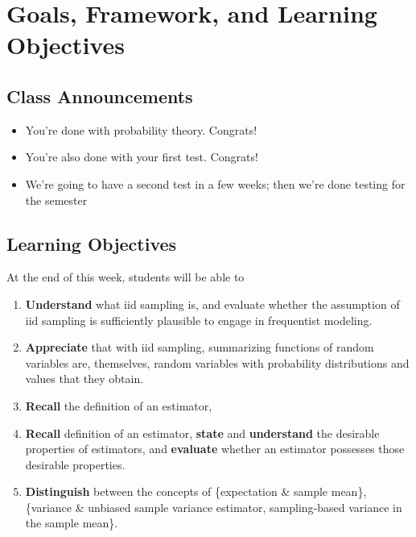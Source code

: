\documentclass[
]{book}
\providecommand{\tightlist}{%
  \setlength{\itemsep}{0pt}\setlength{\parskip}{0pt}}
\theoremstyle{definition}
\theoremstyle{definition}
\theoremstyle{definition}
\theoremstyle{definition}
\theoremstyle{remark}
\begin{document}
\hypertarget{goals-framework-and-learning-objectives}{%
\section{Goals, Framework, and Learning Objectives}\label{goals-framework-and-learning-objectives}}

\hypertarget{class-announcements-3}{%
\subsection{Class Announcements}\label{class-announcements-3}}

\begin{itemize}
\tightlist
\item
  You're done with probability theory. Congrats!
\item
  You're also done with your first test. Congrats!
\item
  We're going to have a second test in a few weeks; then we're done testing for the semester
\end{itemize}

\hypertarget{learning-objectives-4}{%
\subsection{Learning Objectives}\label{learning-objectives-4}}

At the end of this week, students will be able to

\begin{enumerate}
\def\labelenumi{\arabic{enumi}.}
\tightlist
\item
  \textbf{Understand} what iid sampling is, and evaluate whether the assumption of iid sampling is sufficiently plausible to engage in frequentist modeling.
\item
  \textbf{Appreciate} that with iid sampling, summarizing functions of random variables are, themselves, random variables with probability distributions and values that they obtain.
\item
  \textbf{Recall} the definition of an estimator,
\item
  \textbf{Recall} definition of an estimator, \textbf{state} and \textbf{understand} the desirable properties of estimators, and \textbf{evaluate} whether an estimator possesses those desirable properties.
\item
  \textbf{Distinguish} between the concepts of \{expectation \& sample mean\}, \{variance \& unbiased sample variance estimator, sampling-based variance in the sample mean\}.
\end{enumerate}
\end{document}
